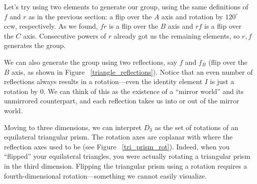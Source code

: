 \documentclass[../gatm.tex]{subfiles}
\begin{document}
Let's try using two elements to generate our group, using the same definitions of $f$ and $r$ as in the previous section: a flip over the $A$ axis and rotation by $120^{\circ}$ ccw, respectively. As we found, $fr$ is a flip over the $B$ axis and $rf$ is a flip over the $C$ axis. Consecutive powers of $r$ already got us the remaining elements, so ${r,f}$ generates the group.

We can also generate the group using two reflections, say $f$ and $f_B$ (flip over the $B$ axis, as shown in Figure ~\ref{triangle_reflections}). Notice that an even number of reflections always results in a rotation---even the identity element $I$ is just a rotation by $0$. We can think of this as the existence of a ``mirror world'' and its unmirrored counterpart, and each reflection takes us into or out of the mirror world.

Moving to three dimensions, we can interpret $D_3$ as the set of rotations of an equilateral triangular prism. The rotation axes are coplanar with where the reflection axes used to be (see Figure ~\ref{tri_prism_rot}). Indeed, when you ``flipped'' your equilateral triangles, you were actually rotating a triangular prism in the third dimension. Flipping the triangular prism using a rotation requires a fourth-dimensional rotation---something we cannot easily visualize.
\end{document}
